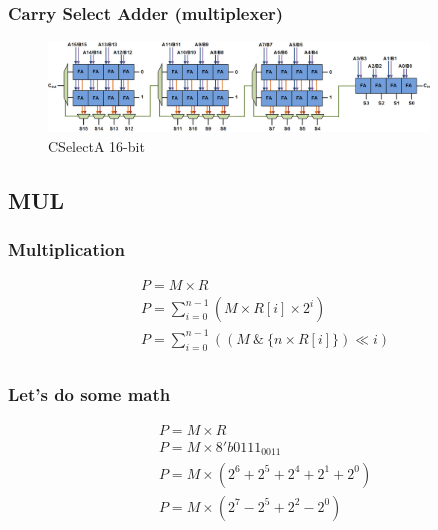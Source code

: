 \begin{frame}
    \frametitle{Carry Select Adder (multiplexer)}
    \begin{figure}
        \centering
        \includegraphics[width=0.9\textwidth]{media/Carry-select-adder-fixed-size.png}
        \caption{CSelectA 16-bit}
    \end{figure}
\end{frame}




\subsection{MUL}

\begin{frame}
    \frametitle{Multiplication}
    \begin{equation}
        \begin{aligned}
            &P = M \times R\\
            &P=\sum_{i=0}^{n-1} (M \times R[i] \times 2^i)\\
            &P=\sum_{i=0}^{n-1} ((M \ \& \ \{n \times R[i]\}) \ll i)\\
        \end{aligned}
    \end{equation}
\end{frame}

\begin{frame}
    \frametitle{Let's do some math}
    \begin{equation}
        \begin{aligned}
            &P = M \times R\\
            &P = M \times 8'b0111_0011\\
            &P = M \times (2^6 + 2^5 + 2^4 + 2^1 + 2^0)\\
            &P = M \times (2^7 - 2^5 + 2^2 - 2^0)\\
        \end{aligned}
    \end{equation}
\end{frame}

